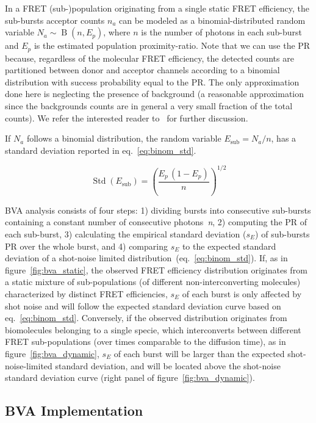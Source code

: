In a FRET (sub-)population originating from a single static FRET efficiency,
the sub-bursts acceptor counts $n_a$ can be modeled as a binomial-distributed random variable 
$N_a \sim \operatorname{B}(n, E_p)$, where $n$ is the number of photons in each sub-burst and 
$E_p$ is the estimated population proximity-ratio. 
Note that we can use the PR because, regardless of the molecular FRET efficiency, 
the detected counts are partitioned between donor and acceptor channels according to
a binomial distribution with success probability equal to the PR.
The only approximation done here is neglecting the presence of background
(a reasonable approximation since the backgrounds counts are in general a 
very small fraction of the total counts). 
We refer the interested reader to~\cite{Torella_2011} for further discussion.

If $N_a$ follows a binomial distribution, the random variable $E_{\textrm{sub}} = N_a/n$,
has a standard deviation reported in eq.~\ref{eq:binom_std}. 

\begin{equation}
\label{eq:binom_std}
\operatorname{Std}(E_{\textrm{sub}}) = \left( \frac{E_p\,(1 - E_p)}{n} \right)^{1/2}
\end{equation}

BVA analysis consists of four steps: 1) dividing bursts into consecutive sub-bursts 
containing a constant number of consecutive photons~\textit{n}, 2) computing the PR 
of each sub-burst, 3) calculating the empirical standard deviation ($s_E$) of sub-bursts
PR over the whole burst, and 4) comparing $s_E$ to the expected standard deviation 
of a shot-noise limited distribution~(eq.~\ref{eq:binom_std}).
If, as in figure~\ref{fig:bva_static}, the observed FRET efficiency distribution 
originates from a static mixture of sub-populations (of different 
non-interconverting molecules) characterized by distinct FRET efficiencies, 
$s_E$ of each burst is only affected by shot noise and will follow the expected 
standard deviation curve based on eq.~\ref{eq:binom_std}. 
Conversely, if the observed distribution originates from biomolecules belonging to a single specie, 
which interconverts between different FRET sub-populations (over times comparable to the diffusion 
time), as in figure~\ref{fig:bva_dynamic}, $s_E$ of each burst will be larger than the expected 
shot-noise-limited standard deviation, and will be located above the shot-noise standard 
deviation curve (right panel of figure~\ref{fig:bva_dynamic}).

\subsection{BVA Implementation}

